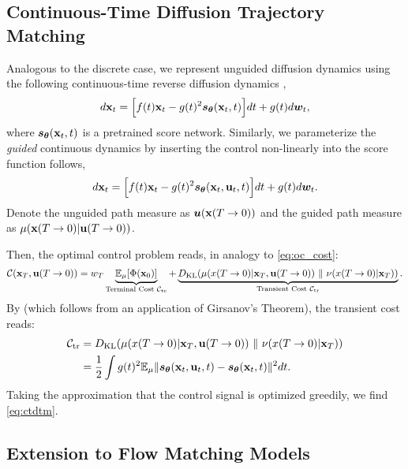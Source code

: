 \subsection{Continuous-Time Diffusion Trajectory Matching}
\label{subsec:cont_diff}



Analogous to the discrete case, we represent unguided diffusion dynamics using the following continuous-time reverse diffusion dynamics \citep{ANDERSON1982313, songscore},
\begin{equation}
d{\mathbf{x}}_t = \Big[f(t){\mathbf{x}}_t - g(t)^2 {\bm{s}}_{\bm{\theta}}({\mathbf{x}}_t, t)\Big]dt + g(t)d{\bm{w}}_t,
\label{eq:unguided_cont_dyn}
\end{equation}
where ${\bm{s}}_{\bm{\theta}}({\mathbf{x}}_t, t)$ is a pretrained score network.
Similarly, we parameterize the \emph{guided} continuous dynamics by inserting the control non-linearly into the score function follows,
\begin{equation}
d{\mathbf{x}}_t = \Big[f(t){\mathbf{x}}_t - g(t)^2 {\bm{s}}_{\bm{\theta}}({\mathbf{x}}_t, {\mathbf{u}}_t, t)\Big]dt + g(t)d{\bm{w}}_t.
\end{equation}
Denote the unguided path measure as ${\bm{u}}({\mathbf{x}}(T \rightarrow 0))$ and the guided path measure as $\mu({\mathbf{x}}(T \rightarrow 0)|{\mathbf{u}}(T \rightarrow 0))$.

Then, the optimal control problem reads, in analogy to \cref{eq:oc_cost}:
\begin{equation}
    {\mathcal{C}}({\mathbf{x}}_T, {\mathbf{u}}(T \rightarrow 0)) = w_T \underbrace{\mathbb{E}_{\mu}[\Phi({\mathbf{x}}_0)]}_\text{Terminal Cost ${\mathcal{C}}_\text{te}$} + \underbrace{D_{\mathrm{KL}}\!\left(\mu(x(T \rightarrow 0)|{\mathbf{x}}_T, {\mathbf{u}}(T \rightarrow 0)) ~ \| ~ \nu(x(T \rightarrow 0)|{\mathbf{x}}_T)\right)}_\text{Transient Cost ${\mathcal{C}}_\text{tr}$}.
    \label{eq:cont_dtm_loss}
\end{equation}
By \citep[Theorem 1 in Appendix A]{song2021maximum} (which follows from an application of Girsanov's Theorem), the transient cost reads:
\begin{align}
    {\mathcal{C}}_\text{tr} &= D_{\mathrm{KL}}\!\left(\mu(x(T \rightarrow 0)|{\mathbf{x}}_T, {\mathbf{u}}(T \rightarrow 0)) ~ \| ~ \nu(x(T \rightarrow 0)|{\mathbf{x}}_T)\right) \\&
    = \frac12 \int g(t)^2 \mathbb{E}_{\mu} \| {\bm{s}}_{\bm{\theta}}({\mathbf{x}}_t, {\mathbf{u}}_t, t) - {\bm{s}}_{\bm{\theta}}({\mathbf{x}}_t, t) \|^2 dt.
\end{align}
Taking the approximation that the control signal is optimized greedily, we find \cref{eq:ctdtm}.










\subsection{Extension to Flow Matching Models}
\label{subsec:flow_match}

